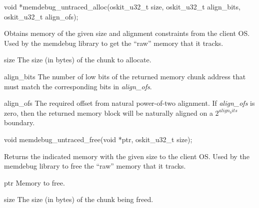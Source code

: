 \begin{apisyn}

	\funcproto void *memdebug_untraced_alloc(oskit_u32_t size,
		oskit_u32_t align_bits, oskit_u32_t align_ofs);
\end{apisyn}
\begin{apidesc}
	Obtains memory of the given size and alignment constraints
	from the client OS\@.
	Used by the memdebug library to get the ``raw'' memory that it tracks.
\end{apidesc}
\begin{apiparm}
	\item[size]
		The size (in bytes) of the chunk to allocate.
	\item[align_bits]
		The number of low bits of the returned memory chunk address
		that must match the corresponding bits in \emph{align_ofs}.
	\item[align_ofs]
		The required offset from natural power-of-two alignment.
		If \emph{align_ofs} is zero,
		then the returned memory block will be naturally aligned
		on a $2^{align_bits}$ boundary.
\end{apiparm}

\begin{apisyn}

	\funcproto void
	memdebug_untraced_free(void *ptr, oskit_u32_t size);
\end{apisyn}
\begin{apidesc}
	Returns the indicated memory with the given size to the client OS\@.
	Used by the memdebug library to free the ``raw'' memory that it tracks.
\end{apidesc}
\begin{apiparm}
	\item[ptr]
		Memory to free.
	\item[size]
		The size (in bytes) of the chunk being freed.
\end{apiparm}

